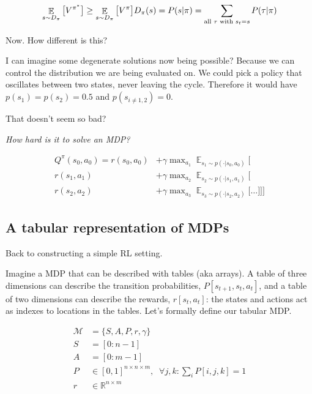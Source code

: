 \[
\mathop{{\mathbb E}}_{s\sim D_{\pi}} \big[ V^{\pi^* } \big] \ge \mathop{{\mathbb E}}_{s\sim D_{\pi}} \big[ V^{\pi} \big] \\
D_{\pi}(s) = P(s | \pi) = \sum_{\text{all } \tau \text{ with } s_t = s} P(\tau | \pi)
\]

Now. How different is this?

I can imagine some degenerate solutions now being possible? Because we
can control the distribution we are being evaluated on. We could pick a
policy that oscillates between two states, never leaving the cycle.
Therefore it would have \(p(s_1) = p(s_2) = 0.5\) and
\(p(s_{i \neq 1,2}) = 0\).

That doesn't seem so bad?

\begin{displayquote}
  \textit{How hard is it to solve an MDP?}
\end{displayquote}


\begin{align*}
Q^{\pi}(s_0, a_0) = r(s_0, a_0) &+ \gamma \mathop{\text{max}}_{a_1} \mathop{\mathbb E}_{s_1\sim p(\cdot | s_0, a_0)} \Bigg[ \\
r(s_1, a_1)  &+ \gamma \mathop{\text{max}}_{a_2} \mathop{\mathbb E}_{s_2\sim p(\cdot | s_1, a_1)} \bigg[\\
r(s_2, a_2)  &+ \gamma \mathop{\text{max}}_{a_3} \mathop{\mathbb E}_{s_3\sim p(\cdot | s_2, a_2)} \Big[
\dots \Big] \bigg] \Bigg]
\end{align*}

\subsection{A tabular representation of MDPs}

Back to constructing a simple RL setting.

Imagine a MDP that can be described with tables (aka arrays). A table of
three dimensions can describe the transition probabilities, $P[s_{t+1}, s_t, a_t]$,
and a table of two dimensions can describe the rewards, $r[s_t, a_t]$: the
states and actions act as indexes to locations in the tables.
Let's formally define our tabular MDP.

\begin{align}
\mathcal M &= \{S, A, P, r, \gamma\}\; \tag{the MDP}\\
S &= [0:n-1] \tag{the state space}\\
A &= [0:m-1] \tag{the action space}\\
P &\in [0,1]^{n\times n \times m}, \;\;\forall j, k : \sum_i P[i, j, k] = 1 \tag{the transition fn}\\
r &\in \mathbb R^{n\times m} \tag{the reward fn}
\end{align}

